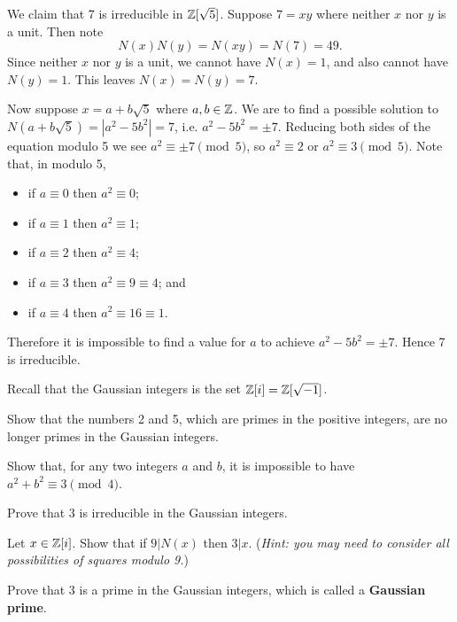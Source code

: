 \begin{example}
    We claim that 7 is irreducible in $\mathbb{Z}[\sqrt{5}]$. Suppose $7 = xy$ where neither $x$ nor $y$ is a unit. Then note
    \[
        N(x)N(y) = N(xy) = N(7) = 49.
    \]
    Since neither $x$ nor $y$ is a unit, we cannot have $N(x) = 1$, and also cannot have $N(y) = 1$. This leaves $N(x) = N(y) = 7$. 
    
    Now suppose $x = a + b\sqrt{5}$ where $a, b \in \mathbb{Z}$. We are to find a possible solution to $N(a+b\sqrt{5}) = |a^2 - 5b^2| = 7$, i.e. $a^2 - 5b^2 = \pm 7$. Reducing both sides of the equation modulo 5 we see $a^2 \equiv \pm7 \pmod5$, so $a^2 \equiv 2$ or $a^2 \equiv 3 \pmod5$. Note that, in modulo 5,
    \begin{itemize}
        \item if $a \equiv 0$ then $a^2 \equiv 0$;
        \item if $a \equiv 1$ then $a^2 \equiv 1$;
        \item if $a \equiv 2$ then $a^2 \equiv 4$;
        \item if $a \equiv 3$ then $a^2 \equiv 9 \equiv 4$; and
        \item if $a \equiv 4$ then $a^2 \equiv 16 \equiv 1$.
    \end{itemize}
    Therefore it is impossible to find a value for $a$ to achieve $a^2 - 5b^2 = \pm7$. Hence 7 is irreducible.
\end{example}

\begin{exercise}
    Recall that the Gaussian integers is the set $\mathbb{Z}[i] = \mathbb{Z}[\sqrt{-1}]$.
    \begin{partquestions}{\alph*}
        \item Show that the numbers 2 and 5, which are primes in the positive integers, are no longer primes in the Gaussian integers.
        \item \begin{partquestions}{\roman*}
            \item Show that, for any two integers $a$ and $b$, it is impossible to have $a^2 + b^2 \equiv 3 \pmod4$.
            \item Prove that 3 is irreducible in the Gaussian integers.
            \item Let $x \in \mathbb{Z}[i]$. Show that if $9 \vert N(x)$ then $3 \vert x$.\newline
            (\textit{Hint: you may need to consider all possibilities of squares modulo 9.})
            \item Prove that 3 is a prime in the Gaussian integers, which is called a \textbf{Gaussian prime}.
        \end{partquestions}
    \end{partquestions}
\end{exercise}

